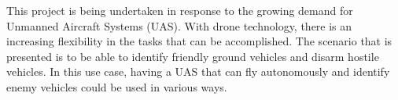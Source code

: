 
This project is being undertaken in response to the growing demand for Unmanned Aircraft Systems (UAS). With drone technology, there is an increasing flexibility in the tasks that can be accomplished. The scenario that is presented is to be able to identify friendly ground vehicles and disarm hostile vehicles. In this use case, having a UAS that can fly autonomously and identify enemy vehicles could be used in various ways.

